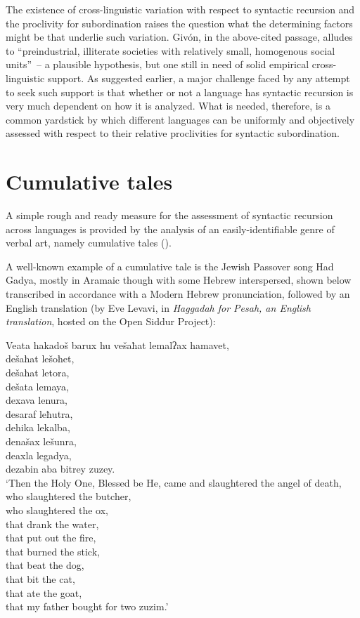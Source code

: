 \documentclass[output=paper,colorlinks,citecolor=brown
]{langscibook}
\begin{document}
The existence of cross-linguistic variation with respect to syntactic recursion and the proclivity for subordination raises the question what the determining factors might be that underlie such variation.  Givón, in the above-cited passage, alludes to ``preindustrial, illiterate societies with relatively small, homogenous social units''~– a plausible hypothesis, but one still in need of solid empirical cross-linguistic support.  As suggested earlier, a major challenge faced by any attempt to seek such support is that whether or not a language has syntactic recursion is very much dependent on how it is analyzed.  What is needed, therefore, is a common yardstick by which different languages can be uniformly and objectively assessed with respect to their relative proclivities for syntactic subordination.

\section{Cumulative tales}
A simple rough and ready measure for the assessment of syntactic recursion across languages is provided by the analysis of an easily-identifiable genre of verbal art, namely cumulative tales (\cites[230--234]{thompson1946folktale}[522--536]{aarne1961types}).

A well-known example of a cumulative tale is the Jewish Passover song Had Gadya, mostly in Aramaic though with some Hebrew interspersed, shown below transcribed in accordance with a Modern Hebrew pronunciation, followed by an English translation (by Eve Levavi, in \textit{Haggadah for Pesah, an English translation}, hosted on the Open Siddur Project):

\ea \label{ex:gil:10}

Veata hakadoš barux hu vešaħat lemalʔax hamavet,\\	
 dešaħat lešoħet,\\
 dešaħat letora,\\
 dešata lemaya,\\
 dexava lenura,\\
 desaraf leħutra,\\
 dehika lekalba,\\
 denašax lešunra,\\
 deaxla legadya,\\
 dezabin aba bitrey zuzey.\\

 `Then the Holy One, Blessed be He, came and slaughtered the angel of death,\\
 who slaughtered the butcher,\\
 who slaughtered the ox, \\
 that drank the water, \\
 that put out the fire, \\
 that burned the stick, \\
 that beat the dog, \\
 that bit the cat, \\
 that ate the goat, \\
 that my father bought for two zuzim.'
\end{document}

